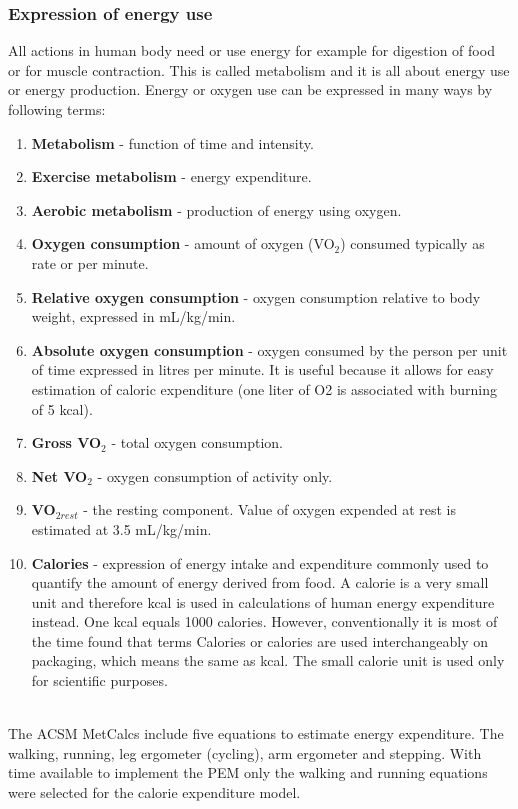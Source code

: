 \documentclass[12pt, a4paper]{report}   %
\begin{document}
\begin{enumerate}
\subsubsection{Expression of energy use}
All actions in human body need or use energy for example for digestion of food or for muscle contraction. This is called metabolism and it is all about energy use or energy production. Energy or oxygen use can be expressed in many ways by following terms:\\
\begin{enumerate}
	\item \textbf{Metabolism} - function of time and intensity.
	\item \textbf{Exercise metabolism} - energy expenditure.
	\item \textbf{Aerobic metabolism} - production of energy using oxygen.
	\item \textbf{Oxygen consumption} - amount of oxygen (VO$_{2}$) consumed typically as rate or per minute.
	\item \textbf{Relative oxygen consumption} - oxygen consumption relative to body weight, expressed in mL/kg/min.
	\item \textbf{Absolute oxygen consumption} - oxygen consumed by the person per unit of time expressed in litres per minute. It is useful because it allows for easy estimation of caloric expenditure (one liter of O2 is associated with burning of 5 kcal).
	\item \textbf{Gross VO$_{2}$} - total oxygen consumption.
	\item \textbf{Net VO$_{2}$} - oxygen consumption of activity only.
	\item \textbf{VO$_{2rest}$} - the resting component. Value of oxygen expended at rest is estimated at 3.5 mL/kg/min.
\item \textbf{Calories} - expression of energy intake and expenditure commonly used to quantify the amount of energy derived from food. A calorie is a very small unit and therefore kcal is used in calculations of human energy expenditure instead. One kcal equals 1000 calories. However, conventionally it is most of the time found that terms Calories or calories are used interchangeably on packaging, which means the same as kcal. The small calorie unit is used only for scientific purposes.\\ \\
\end{enumerate}


The ACSM MetCalcs include five equations to estimate energy expenditure. The walking, running, leg ergometer (cycling), arm ergometer and stepping. With time available to implement the PEM only the walking and running equations were selected for the calorie expenditure model.\\ \\


\end{enumerate}
\end{document}
